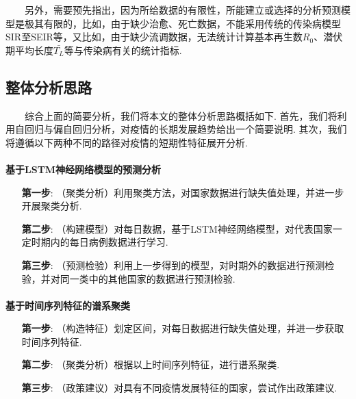 \documentclass[a4paper, titlepage]{article}
\begin{document}
        　　另外，需要预先指出，因为所给数据的有限性，所能建立或选择的分析预测模型是极其有限的，比如，由于缺少治愈、死亡数据，不能采用传统的传染病模型SIR至SEIR等，又比如，由于缺少流调数据，无法统计计算基本再生数$R_0$、潜伏期平均长度$\bar{T_L}$等与传染病有关的统计指标. 

        \subsection{整体分析思路}
        　　综合上面的简要分析，我们将本文的整体分析思路概括如下. 首先，我们将利用自回归与偏自回归分析，对疫情的长期发展趋势给出一个简要说明. 其次，我们将遵循以下两种不同的路径对疫情的短期性特征展开分析.

        \paragraph{} \textbf{基于LSTM神经网络模型的预测分析}
        \vspace{5pt}
        \begin{adjustwidth}{1cm}{0cm}
        {\kaishu
        \begin{itemize}[itemsep=-1pt,topsep=1pt]
            \item [\textbf{第一步}:]（聚类分析）利用聚类方法，对国家数据进行缺失值处理，并进一步开展聚类分析.
            \item [\textbf{第二步}:]（构建模型）对每日数据，基于LSTM神经网络模型，对代表国家一定时期内的每日病例数据进行学习.
            \item [\textbf{第三步}:]（预测检验）利用上一步得到的模型，对时期外的数据进行预测检验，并对同一类中的其他国家的数据进行预测检验.
        \end{itemize}
        }
        \end{adjustwidth}
        \vspace{5pt}
        
        \paragraph{} \textbf{基于时间序列特征的谱系聚类}
        \vspace{5pt}
        \begin{adjustwidth}{1cm}{0cm}
        {\kaishu
        \begin{itemize}[itemsep=-1pt,topsep=1pt]
            \item [\textbf{第一步}:]（构造特征）划定区间，对每日数据进行缺失值处理，并进一步获取时间序列特征.
            \item [\textbf{第二步}:]（聚类分析）根据以上时间序列特征，进行谱系聚类.
            \item [\textbf{第三步}:]（政策建议）对具有不同疫情发展特征的国家，尝试作出政策建议.
        \end{itemize}
        }
        \end{adjustwidth}
\end{document}
